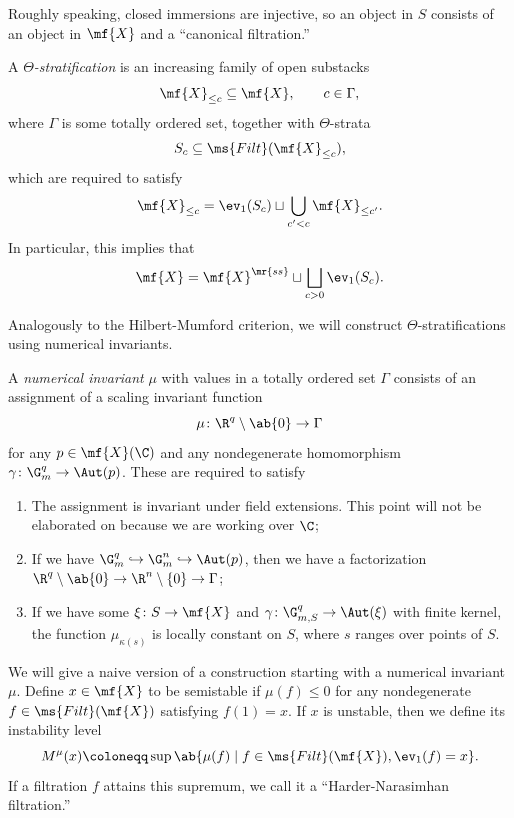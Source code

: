 Roughly speaking, closed immersions are injective, so an object in \(S\) consists of an object in \(\mf{X}\) and a ``canonical filtration.''

\begin{defn}
    A \textit{\(\Theta\)-stratification} is an increasing family of open substacks
    \[ \mf{X}_{\leq c} \subseteq \mf{X}, \qquad c \in \Gamma, \]
    where \(\Gamma\) is some totally ordered set, together with \(\Theta\)-strata
    \[ S_c \subseteq \ms{Filt}(\mf{X}_{\leq c}), \]
    which are required to satisfy
    \[ \mf{X}_{\leq c} = \ev_1(S_c) \sqcup \bigcup_{c' < c} \mf{X}_{\leq c'}. \]
    In particular, this implies that
    \[ \mf{X} = \mf{X}^{\mr{ss}} \sqcup \bigsqcup_{c > 0} \ev_1(S_c). \]
\end{defn}

Analogously to the Hilbert-Mumford criterion, we will construct \(\Theta\)-stratifications using numerical invariants.
\begin{defn}
    A \textit{numerical invariant} \(\mu\) with values in a totally ordered set \(\Gamma\) consists of an assignment of a scaling invariant function
    \[ \mu \colon \R^q \setminus \ab\{0\} \to \Gamma \]
    for any \(p \in \mf{X}(\C)\) and any nondegenerate homomorphism \(\gamma \colon \G_m^q \to \Aut(p)\). These are required to satisfy
    \begin{enumerate}
        \item The assignment is invariant under field extensions. This point will not be elaborated on because we are working over \(\C\);
        \item If we have \(\G_m^q \hookrightarrow \G_m^n \hookrightarrow \Aut(p)\), then we have a factorization \(\R^q \setminus \ab\{0\} \to \R^n \setminus \{0\} \to \Gamma\);
        \item If we have some \(\xi \colon S \to \mf{X}\) and \(\gamma \colon \G_{m, S}^q \to \Aut(\xi)\) with finite kernel, the function \(\mu_{\kappa(s)}\) is locally constant on \(S\), where \(s\) ranges over points of \(S\).
    \end{enumerate}
\end{defn}

We will give a naive version of a construction starting with a numerical invariant \(\mu\). Define \(x \in \mf{X}\) to be semistable if \(\mu(f) \leq 0\) for any nondegenerate \(f \in \ms{Filt}(\mf{X})\) satisfying \(f(1) = x\). If \(x\) is unstable, then we define its instability level
\[ M^{\mu}(x) \coloneqq \sup \ab\{ \mu(f) \mid f \in \ms{Filt}(\mf{X}), \ev_1(f) = x\}. \]
If a filtration \(f\) attains this supremum, we call it a ``Harder-Narasimhan filtration.''

